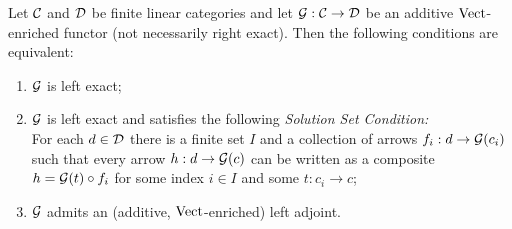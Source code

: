 \documentclass{amsart}
\begin{document}
\begin{proposition} \label{prop:AFT}
	Let $\mathcal C$ and $\mathcal D$ be finite linear categories and let $\mathcal G: \mathcal C \rightarrow \mathcal D$  be an additive $\mathrm{Vect}$-enriched functor (not necessarily right exact). Then the following conditions are equivalent:
	\begin{enumerate}
		\item $\mathcal G$ is left exact;  
		\item $\mathcal G$ is left exact and satisfies the following {\em Solution Set Condition:} \\  For each $d \in \mathcal D$ there is a finite set $I$ and a collection of arrows $f_i:d \to \mathcal G(c_i)$ such that every arrow $h:d \to \mathcal G(c)$ can be written as a composite $h = \mathcal G(t) \circ f_i$ for some index $i \in I$ and some $t: c_i \to c$; 
		\item $\mathcal G$ admits an (additive, ${\mathrm{Vect}}$-enriched) left adjoint.
	\end{enumerate}
\end{proposition}
\end{document}
